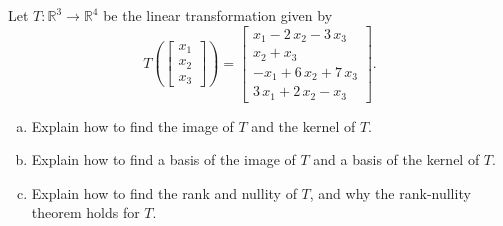 
\begin{exerciseStatement}
 Let \(T:\mathbb{R}^ 3  \to \mathbb{R}^ 4 \) be the linear transformation given by \[T\left(  \left[\begin{array}{c}
x_{1} \\
x_{2} \\
x_{3}
\end{array}\right]  \right) =  \left[\begin{array}{c}
x_{1} - 2 \, x_{2} - 3 \, x_{3} \\
x_{2} + x_{3} \\
-x_{1} + 6 \, x_{2} + 7 \, x_{3} \\
3 \, x_{1} + 2 \, x_{2} - x_{3}
\end{array}\right] .\]
\begin{enumerate}[(a)]
\item Explain how to find the image of \(T\) and the kernel of \(T\).
\item Explain how to find a basis of the image of \(T\) and a basis of the kernel of \(T\).
\item Explain how to find the rank and nullity of \(T\), and why the rank-nullity theorem holds for \(T\).
\end{enumerate}
    
\end{exerciseStatement}
    
